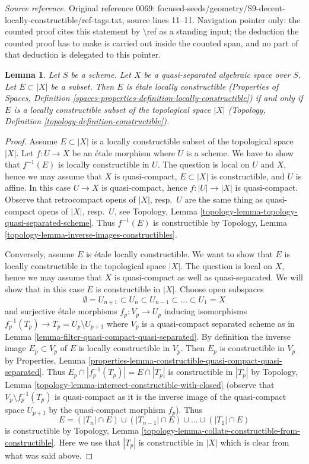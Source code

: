 \documentclass{stacks-project}
\theoremstyle{plain}
\newtheorem{lemma}[subsection]{Lemma}
\theoremstyle{definition}
\theoremstyle{remark}
\numberwithin{equation}{subsection}
\begin{document}
\noindent\textit{Source reference.} Original reference 0069: focused-seeds/geometry/S9-decent-locally-constructible/ref-tags.txt, source lines 11--11. Navigation pointer only: the counted proof cites this statement by \textbackslash{}ref as a standing input; the deduction the counted proof has to make is carried out inside the counted span, and no part of that deduction is delegated to this pointer.\par\medskip
\begin{lemma}
\label{lemma-locally-constructible}
Let $S$ be a scheme. Let $X$ be a quasi-separated algebraic space over $S$.
Let $E \subset |X|$ be a subset. Then $E$ is \'etale locally constructible
(Properties of Spaces, Definition
\ref{spaces-properties-definition-locally-constructible})
if and only if $E$ is a locally constructible subset of
the topological space $|X|$
(Topology, Definition \ref{topology-definition-constructible}).
\end{lemma}

\begin{proof}
Assume $E \subset |X|$ is a locally constructible subset of
the topological space $|X|$. Let $f : U \to X$ be an
\'etale morphism where $U$ is a scheme. We have to show that
$f^{-1}(E)$ is locally constructible in $U$. The question is
local on $U$ and $X$, hence we may assume that $X$ is quasi-compact,
$E \subset |X|$ is constructible, and $U$ is affine.
In this case $U \to X$ is quasi-compact, hence
$f : |U| \to |X|$ is quasi-compact. Observe that retrocompact
opens of $|X|$, resp.\ $U$ are the same thing as quasi-compact opens
of $|X|$, resp.\ $U$, see
Topology, Lemma \ref{topology-lemma-topology-quasi-separated-scheme}.
Thus $f^{-1}(E)$ is constructible by Topology, Lemma
\ref{topology-lemma-inverse-images-constructibles}.

\medskip\noindent
Conversely, assume $E$ is \'etale locally constructible.
We want to show that $E$ is locally constructible in the
topological space $|X|$.
The question is local on $X$, hence we may assume that $X$ is
quasi-compact as well as quasi-separated. We will show that
in this case $E$ is constructible in $|X|$.
Choose open subspaces
$$
\emptyset = U_{n + 1} \subset
U_n \subset U_{n - 1} \subset \ldots \subset U_1 = X
$$
and surjective \'etale morphisms $f_p : V_p \to U_p$
inducing isomorphisms $f_p^{-1}(T_p) \to T_p = U_p \setminus U_{p + 1}$
where $V_p$ is a quasi-compact separated scheme as in
Lemma \ref{lemma-filter-quasi-compact-quasi-separated}.
By definition the inverse image $E_p \subset V_p$ of $E$ is
locally constructible in $V_p$. Then $E_p$ is constructible in $V_p$
by Properties, Lemma
\ref{properties-lemma-constructible-quasi-compact-quasi-separated}.
Thus $E_p \cap |f_p^{-1}(T_p)| = E \cap |T_p|$ is constructible
in $|T_p|$ by
Topology, Lemma \ref{topology-lemma-intersect-constructible-with-closed}
(observe that $V_p \setminus f_p^{-1}(T_p)$ is quasi-compact as it is the
inverse image of the quasi-compact space $U_{p + 1}$ by the
quasi-compact morphism $f_p$).
Thus
$$
E = (|T_n| \cap E) \cup (|T_{n - 1}| \cap E) \cup \ldots \cup
(|T_1| \cap E)
$$
is constructible by
Topology, Lemma \ref{topology-lemma-collate-constructible-from-constructible}.
Here we use that $|T_p|$ is constructible in $|X|$ which is clear from
what was said above.
\end{proof}
\end{document}
